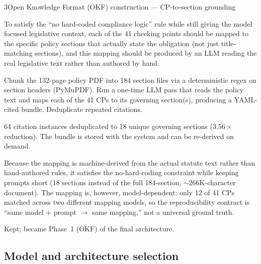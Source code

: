 \begin{explog}{3}{Open Knowledge Format (OKF) construction --- CP-to-section grounding}
\item[Hypothesis] To satisfy the ``no hard-coded compliance logic'' rule while still giving the model focused legislative context, each of the 41 checking points should be mapped to the specific policy sections that actually state the obligation (not just title-matching sections), and this mapping should be produced by an LLM reading the real legislative text rather than authored by hand.
\item[Method] Chunk the 132-page policy PDF into 184 section files via a deterministic regex on section headers (PyMuPDF). Run a one-time LLM pass that reads the policy text and maps each of the 41 CPs to its governing section(s), producing a YAML-cited bundle. Deduplicate repeated citations.
\item[Result] 64 citation instances deduplicated to 18 unique governing sections ($3.56\times$ reduction). The bundle is stored with the system and can be re-derived on demand.
\item[Inference] Because the mapping is machine-derived from the actual statute text rather than hand-authored rules, it satisfies the no-hard-coding constraint while keeping prompts short (18 sections instead of the full 184-section, $\sim$266K-character document). The mapping is, however, model-dependent: only 12 of 41 CPs matched across two different mapping models, so the reproducibility contract is ``same model + prompt $\to$ same mapping,'' not a universal ground truth.
\item[Verdict] Kept; became Phase~1 (OKF) of the final architecture.
\end{explog}


\subsection{Model and architecture selection}

